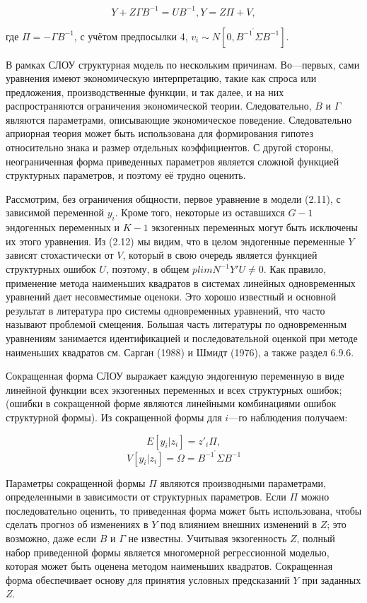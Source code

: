 \begin{equation}
Y+Z\Gamma B^{-1}=UB^{-1},
Y=Z\Pi+V,
\end{equation}

где $\Pi= -\Gamma B^{-1}$, с учётом предпосылки 4, $v_{i} \sim N[0,B^{-1^{'}} \Sigma B^{-1}]$.


	В рамках СЛОУ структурная модель  по нескольким причинам. Во---первых, сами уравнения имеют экономическую интерпретацию, такие как спроса или предложения, производственные функции, и так далее, и на них распространяются ограничения экономической теории. Следовательно, $B$ и $\Gamma$ являются параметрами, описывающие экономическое поведение. Следовательно априорная теория может быть использована для формирования гипотез относительно знака и размер отдельных коэффициентов. С другой стороны, неограниченная форма приведенных параметров является сложной функцией структурных параметров, и поэтому её трудно оценить.  

	
	Рассмотрим, без ограничения общности, первое уравнение в модели (2.11), с зависимой переменной $y_{i}$. Кроме того, некоторые из оставшихся $G-1$ эндогенных переменных и $K-1$ экзогенных переменных могут быть исключены их этого уравнения. Из (2.12) мы видим, что в целом эндогенные переменные $Y$ зависят стохастически от $V$, который в свою очередь является функцией структурных ошибок $U$, поэтому, в общем $plim N^{-1}Y'U\not=0$. Как правило, применение метода наименьших квадратов в системах линейных одновременных уравнений дает несовместимые оценоки. Это хорошо известный и основной результат в литература про системы одновременных уравнений, что часто называют проблемой смещения. Большая часть литературы по одновременным уравнениям занимается идентификацией и последовательной оценкой при методе наименьших квадратов см. Сарган (1988) и Шмидт (1976), а также раздел 6.9.6. 
	
	
	Сокращенная форма СЛОУ выражает каждую эндогенную переменную в виде линейной функции всех экзогенных переменных и всех структурных ошибок; (ошибки в сокращенной форме являются линейными комбинациями ошибок структурной формы). Из сокращенной формы для $i$---го наблюдения получаем:

\begin{equation}
E[y_{i}|z_{i}]=z'_{i}\Pi,
\end{equation}
\begin{equation}
V[y_{i}|z_{i}]=\Omega=B^{-1^{'}} \Sigma B^{-1}
\end{equation}
 
 
Параметры сокращенной формы $\Pi$ являются производными параметрами, определенными в зависимости от структурных параметров. Если $\Pi$  можно последовательно оценить, то приведенная форма может быть использована, чтобы сделать прогноз об изменениях в $Y$ под влиянием внешних изменений в $Z$; это возможно, даже если $B$ и $\Gamma$ не известны. Учитывая экзогенность $Z$, полный набор приведенной формы является многомерной регрессионной моделью, которая может быть оценена методом наименьших квадратов. Сокращенная форма обеспечивает основу для принятия условных предсказаний $Y$ при заданных $Z$. 


